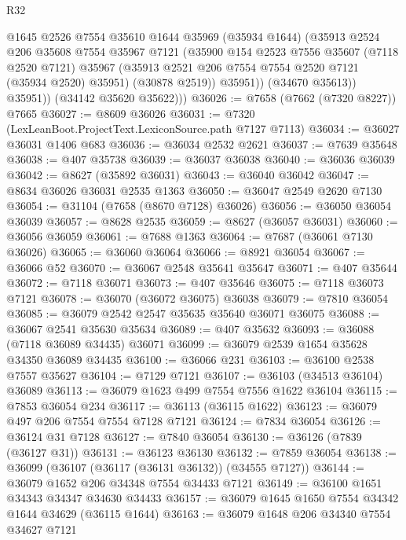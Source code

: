 \begin{lexlean}{R32}
\begin{coremodule}
                @1645
                @2526
                @7554
                @35610
                @1644
                @35969
                (@35934 @1644)
                (@35913
                  @2524
                  @206
                  @35608
                  @7554
                  @35967
                  @7121
                  (@35900
                    @154
                    @2523
                    @7556
                    @35607
                    (@7118 @2520 @7121)
                    @35967
                    (@35913 @2521 @206 @7554 @7554 @2520 @7121 (@35934 @2520) @35951)
                    (@30878 @2519))
                  @35951))
              (@34670 @35613))
            @35951))
        (@34142 @35620 @35622)))
@36026 := @7658 (@7662 (@7320 @8227)) @7665
@36027 := @8609 @36026
@36031 := @7320 (LexLeanBoot.ProjectText.LexiconSource.path @7127 @7113)
@36034 := @36027 @36031 @1406 @683
@36036 := @36034 @2532 @2621
@36037 := @7639 @35648
@36038 := @407 @35738
@36039 := @36037 @36038
@36040 := @36036 @36039
@36042 := @8627 (@35892 @36031)
@36043 := @36040 @36042
@36047 := @8634 @36026 @36031 @2535 @1363
@36050 := @36047 @2549 @2620 @7130
@36054 := @31104 (@7658 (@8670 @7128) @36026)
@36056 := @36050 @36054 @36039
@36057 := @8628 @2535
@36059 := @8627 (@36057 @36031)
@36060 := @36056 @36059
@36061 := @7688 @1363
@36064 := @7687 (@36061 @7130 @36026)
@36065 := @36060 @36064
@36066 := @8921 @36054
@36067 := @36066 @52
@36070 := @36067 @2548 @35641 @35647
@36071 := @407 @35644
@36072 := @7118 @36071
@36073 := @407 @35646
@36075 := @7118 @36073 @7121
@36078 := @36070 (@36072 @36075) @36038
@36079 := @7810 @36054
@36085 := @36079 @2542 @2547 @35635 @35640 @36071 @36075
@36088 := @36067 @2541 @35630 @35634
@36089 := @407 @35632
@36093 := @36088 (@7118 @36089 @34435) @36071
@36099 := @36079 @2539 @1654 @35628 @34350 @36089 @34435
@36100 := @36066 @231
@36103 := @36100 @2538 @7557 @35627
@36104 := @7129 @7121
@36107 := @36103 (@34513 @36104) @36089
@36113 := @36079 @1623 @499 @7554 @7556 @1622 @36104
@36115 := @7853 @36054 @234
@36117 := @36113 (@36115 @1622)
@36123 := @36079 @497 @206 @7554 @7554 @7128 @7121
@36124 := @7834 @36054
@36126 := @36124 @31 @7128
@36127 := @7840 @36054
@36130 := @36126 (@7839 (@36127 @31))
@36131 := @36123 @36130
@36132 := @7859 @36054
@36138 := @36099 (@36107 (@36117 (@36131 @36132)) (@34555 @7127))
@36144 := @36079 @1652 @206 @34348 @7554 @34433 @7121
@36149 := @36100 @1651 @34343 @34347 @34630 @34433
@36157 := @36079 @1645 @1650 @7554 @34342 @1644 @34629 (@36115 @1644)
@36163 := @36079 @1648 @206 @34340 @7554 @34627 @7121

\end{coremodule}
\end{lexlean}
